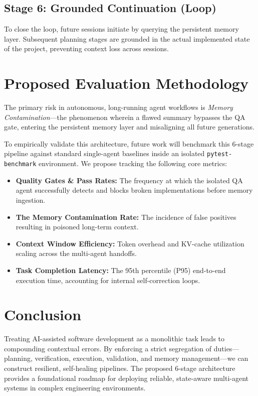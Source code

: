 \documentclass[11pt,a4paper]{article}
\begin{document}
\subsection{Stage 6: Grounded Continuation (Loop)}
To close the loop, future sessions initiate by querying the persistent memory layer. Subsequent planning stages are grounded in the actual implemented state of the project, preventing context loss across sessions.

\section{Proposed Evaluation Methodology}
The primary risk in autonomous, long-running agent workflows is \textit{Memory Contamination}---the phenomenon wherein a flawed summary bypasses the QA gate, entering the persistent memory layer and misaligning all future generations. 

To empirically validate this architecture, future work will benchmark this 6-stage pipeline against standard single-agent baselines inside an isolated \texttt{pytest-benchmark} environment. We propose tracking the following core metrics:

\begin{itemize}[noitemsep]
    \item \textbf{Quality Gates \& Pass Rates:} The frequency at which the isolated QA agent successfully detects and blocks broken implementations before memory ingestion.
    \item \textbf{The Memory Contamination Rate:} The incidence of false positives resulting in poisoned long-term context.
    \item \textbf{Context Window Efficiency:} Token overhead and KV-cache utilization scaling across the multi-agent handoffs.
    \item \textbf{Task Completion Latency:} The 95th percentile (P95) end-to-end execution time, accounting for internal self-correction loops.
\end{itemize}

\section{Conclusion}
Treating AI-assisted software development as a monolithic task leads to compounding contextual errors. By enforcing a strict segregation of duties---planning, verification, execution, validation, and memory management---we can construct resilient, self-healing pipelines. The proposed 6-stage architecture provides a foundational roadmap for deploying reliable, state-aware multi-agent systems in complex engineering environments.
\end{document}
